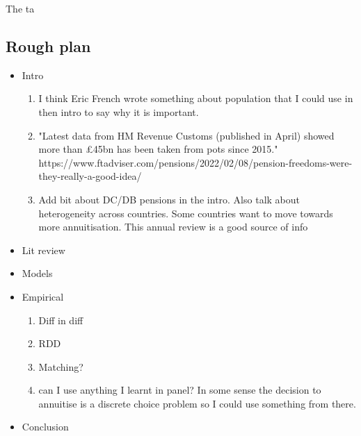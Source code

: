 \documentclass[12pt]{article}
\begin{document}
The ta

\subsection{Rough plan}
\begin{itemize}
  \item Intro
        \begin{enumerate}
          \item I think Eric French wrote something about population that I could use in then intro to say why it is important.
          \item "Latest data from HM Revenue Customs (published in April) showed more than £45bn has been taken from pots since 2015."
                https://www.ftadviser.com/pensions/2022/02/08/pension-freedoms-were-they-really-a-good-idea/


          \item Add bit about DC/DB pensions in the intro. Also talk about heterogeneity across countries.
                Some countries want to move towards more annuitisation. This annual review is a good source of info
                \cite{banks_crawford_ar_2022}
        \end{enumerate}
  \item Lit review
  \item Models
  \item Empirical
        \begin{enumerate}
          \item Diff in diff
          \item RDD
          \item Matching?
          \item can I use anything I learnt in panel?
                In some sense the decision to annuitise is a discrete choice problem so I could use something from there.
        \end{enumerate}
  \item Conclusion
\end{itemize}




\end{document}
